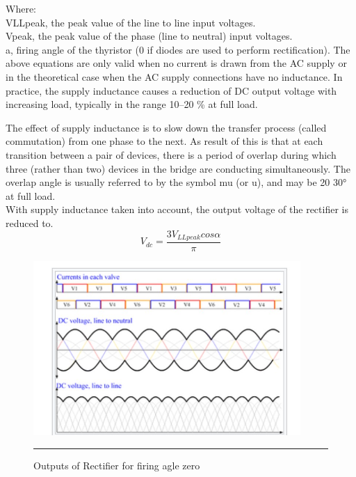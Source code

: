 Where:
\\VLLpeak, the peak value of the line to line input voltages.
\\Vpeak, the peak value of the phase (line to neutral) input voltages.
\\a, firing angle of the thyristor (0 if diodes are used to perform rectification).
The above equations are only valid when no current is drawn from the AC 
supply or in the theoretical case when the AC supply connections have no inductance.
In practice, the supply inductance causes a reduction of DC output voltage 
with increasing load, typically in the range 10–20 \% at full load.

The effect of supply inductance is to slow down the transfer process 
(called commutation) from one phase to the next. As result of this is 
that at each transition between a pair of devices, there is a period 
of overlap during which three (rather than two) devices in the bridge 
are conducting simultaneously. The overlap angle is usually referred 
to by the symbol mu (or u), and may be 20 30° at full load.\\
With supply inductance taken into account, the output voltage of the
rectifier is reduced to.
\begin{equation}
	V_{dc}=\frac{3V_{LLpeak} cos{\alpha} }{\pi}
\end{equation}
\begin{figure}[htbp]
	\centering
		\includegraphics[width = 4in]{./Figures/rectifier.jpg}
		\rule{35em}{5pt}
	\caption{Outputs of Rectifier for firing agle zero}
	\label{fig:1}
\end{figure}
\newpage 
